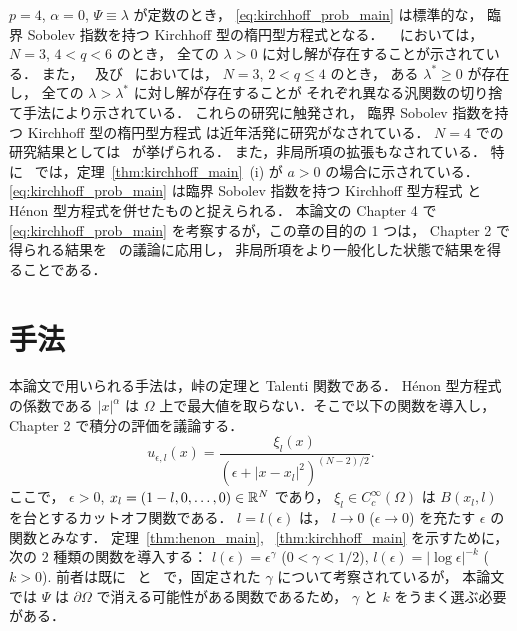 $p = 4$, $\alpha = 0$, $\Psi \equiv \lambda$ が定数のとき，
\eqref{eq:kirchhoff_prob_main} は標準的な，
臨界 Sobolev 指数を持つ Kirchhoff 型の楕円型方程式となる．
~\cite{MR3278854} においては，
$N = 3$, $4 < q < 6$ のとき，
全ての $\lambda > 0$ に対し解が存在することが示されている．
また，~\cite{MR3018020} 及び~\cite{MR3278854} においては，
$N = 3$, $2 < q \leq 4$ のとき，
ある $\lambda^* \geq 0$ が存在し，
全ての $\lambda > \lambda^*$ に対し解が存在することが
それぞれ異なる汎関数の切り捨て手法により示されている．
これらの研究に触発され，
臨界 Sobolev 指数を持つ Kirchhoff 型の楕円型方程式
は近年活発に研究がなされている．
$N = 4$ での研究結果としては~\cite{MR3210026} が挙げられる．
また，非局所項の拡張もなされている．
特に~\cite{MR3539075} では，定理~\ref{thm:kirchhoff_main}~(i) が
$a > 0$ の場合に示されている．
\eqref{eq:kirchhoff_prob_main}
は臨界 Sobolev 指数を持つ Kirchhoff 型方程式
と Hénon 型方程式を併せたものと捉えられる．
本論文の Chapter 4 で
\eqref{eq:kirchhoff_prob_main} を考察するが，この章の目的の 1 つは，
Chapter 2 で得られる結果を~\cite{MR3278854} の議論に応用し，
非局所項をより一般化した状態で結果を得ることである．

\section{手法}

本論文で用いられる手法は，峠の定理と Talenti 関数である．
Hénon 型方程式の係数である $\lvert x \rvert^\alpha$ は
$\Omega$ 上で最大値を取らない．そこで以下の関数を導入し，
Chapter 2 で積分の評価を議論する．
\[
  u_{\epsilon, l}(x) = \frac{\xi_l(x)}{\left(\epsilon +
    \left\lvert x - x_l \right\rvert^2 \right)^{(N-2)/2}}.
\]
ここで， $\epsilon > 0$, $x_l = (1-l, 0, \dots, 0) \in \mathbb{R}^N$ であり，
$\xi_l \in C^\infty_c (\Omega)$ は
$B(x_l, l)$ を台とするカットオフ関数である．
$l = l(\epsilon)$ は，
$l \to 0$ ($\epsilon \to 0$) を充たす
$\epsilon$ の関数とみなす．
定理~\ref{thm:henon_main}, ~\ref{thm:kirchhoff_main} を示すために，
次の $2$ 種類の関数を導入する：
$l(\epsilon) = \epsilon^\gamma$ ($0 < \gamma < 1/2$),
$l(\epsilon) = \lvert \log \epsilon \rvert^{-k}$ ($k > 0$).
前者は既に~\cite{MR2951742} と~\cite{MR2951722}
で，固定された $\gamma$ について考察されているが，
本論文では $\Psi$ は $\partial \Omega$ で消える可能性がある関数であるため，
$\gamma$ と $k$ をうまく選ぶ必要がある．

